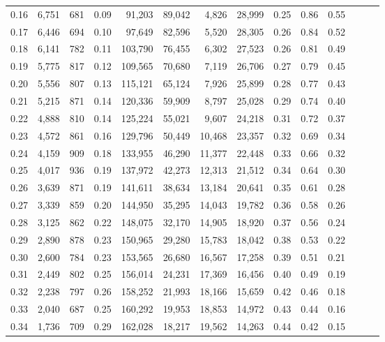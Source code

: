 \begin{tabular}{rrrrrrrrrrrrrr}
0.16 &  6,751 &  681 &  0.09 &   91,203 &   89,042 &   4,826 &  28,999 &  0.25 &  0.86 &      0.55 \\
0.17 &  6,446 &  694 &  0.10 &   97,649 &   82,596 &   5,520 &  28,305 &  0.26 &  0.84 &      0.52 \\
0.18 &  6,141 &  782 &  0.11 &  103,790 &   76,455 &   6,302 &  27,523 &  0.26 &  0.81 &      0.49 \\
0.19 &  5,775 &  817 &  0.12 &  109,565 &   70,680 &   7,119 &  26,706 &  0.27 &  0.79 &      0.45 \\
0.20 &  5,556 &  807 &  0.13 &  115,121 &   65,124 &   7,926 &  25,899 &  0.28 &  0.77 &      0.43 \\
0.21 &  5,215 &  871 &  0.14 &  120,336 &   59,909 &   8,797 &  25,028 &  0.29 &  0.74 &      0.40 \\
0.22 &  4,888 &  810 &  0.14 &  125,224 &   55,021 &   9,607 &  24,218 &  0.31 &  0.72 &      0.37 \\
0.23 &  4,572 &  861 &  0.16 &  129,796 &   50,449 &  10,468 &  23,357 &  0.32 &  0.69 &      0.34 \\
0.24 &  4,159 &  909 &  0.18 &  133,955 &   46,290 &  11,377 &  22,448 &  0.33 &  0.66 &      0.32 \\
0.25 &  4,017 &  936 &  0.19 &  137,972 &   42,273 &  12,313 &  21,512 &  0.34 &  0.64 &      0.30 \\
0.26 &  3,639 &  871 &  0.19 &  141,611 &   38,634 &  13,184 &  20,641 &  0.35 &  0.61 &      0.28 \\
0.27 &  3,339 &  859 &  0.20 &  144,950 &   35,295 &  14,043 &  19,782 &  0.36 &  0.58 &      0.26 \\
0.28 &  3,125 &  862 &  0.22 &  148,075 &   32,170 &  14,905 &  18,920 &  0.37 &  0.56 &      0.24 \\
0.29 &  2,890 &  878 &  0.23 &  150,965 &   29,280 &  15,783 &  18,042 &  0.38 &  0.53 &      0.22 \\
0.30 &  2,600 &  784 &  0.23 &  153,565 &   26,680 &  16,567 &  17,258 &  0.39 &  0.51 &      0.21 \\
0.31 &  2,449 &  802 &  0.25 &  156,014 &   24,231 &  17,369 &  16,456 &  0.40 &  0.49 &      0.19 \\
0.32 &  2,238 &  797 &  0.26 &  158,252 &   21,993 &  18,166 &  15,659 &  0.42 &  0.46 &      0.18 \\
0.33 &  2,040 &  687 &  0.25 &  160,292 &   19,953 &  18,853 &  14,972 &  0.43 &  0.44 &      0.16 \\
0.34 &  1,736 &  709 &  0.29 &  162,028 &   18,217 &  19,562 &  14,263 &  0.44 &  0.42 &      0.15 \\

\end{tabular}

